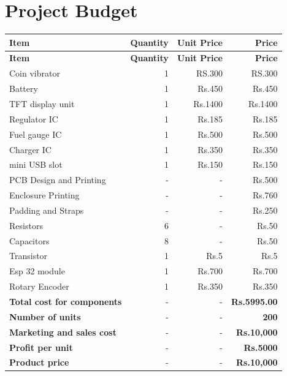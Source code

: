 \documentclass{article}
\begin{document}
        \newpage
        \section{Project Budget}
        \begin{longtable}{|l|r|r|r|}
        
        \hline
        \textbf{Item} & \textbf{Quantity} & \textbf{Unit Price} & \textbf{Price} \\
        \hline
        \endfirsthead
        
        \hline
        \textbf{Item} & \textbf{Quantity} & \textbf{Unit Price} & \textbf{Price} \\
        \hline
        \endhead
        
        \hline
        \endfoot
        
        \hline
        \endlastfoot
        
        Coin vibrator & 1 & RS.300 & RS.300 \\
        Battery & 1 & Rs.450 & Rs.450 \\
        TFT display unit & 1 & Rs.1400 & Rs.1400 \\
        Regulator IC & 1 & Rs.185 & Rs.185 \\
        Fuel gauge IC & 1 & Rs.500 & Rs.500 \\
        Charger IC & 1 & Rs.350 & Rs.350 \\
        mini USB slot & 1 & Rs.150 & Rs.150 \\
        PCB Design and Printing & - & - & Rs.500 \\
        Enclosure Printing & - & - & Rs.760 \\
        Padding and Straps & - & - & Rs.250 \\
        Resistors & 6 & - & Rs.50 \\
        Capacitors & 8 & - & Rs.50 \\
        Transistor & 1 & Rs.5 & Rs.5 \\
        Esp 32 module & 1 & Rs.700 & Rs.700 \\
        Rotary Encoder & 1 & Rs.350 & Rs.350 \\
        \hline
        \textbf{Total cost for components} & - & - & \textbf{Rs.5995.00} \\
        \textbf{Number of units} & - & - & \textbf{200} \\
        \textbf{Marketing and sales cost} & - & - & \textbf{Rs.10,000} \\
        \textbf{Profit per unit} & - & - & \textbf{Rs.5000} \\
        \textbf{Product price} & - & - & \textbf{Rs.10,000} \\
        \hline
        \end{longtable}
        
\end{document}
